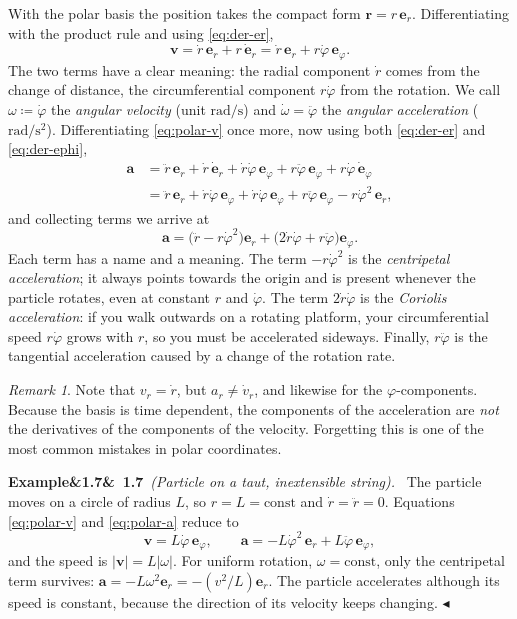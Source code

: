 \documentclass[11pt,a4paper,oneside]{report}
\numberwithin{equation}{chapter}
\newcommand{\vect}[1]{\bm{#1}}
\newcommand{\e}[1]{\vect{e}_{#1}}
\theoremstyle{plain}
\theoremstyle{definition}
\theoremstyle{remark}
\newtheorem{remark}[theorem]{Remark}
\newenvironment{example}[2]{%
  \par\addvspace{\bigskipamount}\noindent
  \textbf{Example\ifx&#1&\else~#1\fi}\ \textit{(#2).}\ \ignorespaces}%
  {\hfill$\blacktriangleleft$\par\addvspace{\bigskipamount}}
\begin{document}
With the polar basis the position takes the compact form $\vect r=r\,\e r$. Differentiating with the product rule
and using \eqref{eq:der-er},
\begin{equation}\label{eq:polar-v}
  \vect v=\dot r\,\e r+r\,\dot{\vect e}_r=\dot r\,\e r+r\dot\varphi\,\e\varphi .
\end{equation}
The two terms have a clear meaning: the radial component $\dot r$ comes from the change of distance, the
circumferential component $r\dot\varphi$ from the rotation. We call $\omega\coloneqq\dot\varphi$ the \emph{angular
velocity} (unit $\si{\radian\per\second}$) and $\dot\omega=\ddot\varphi$ the \emph{angular acceleration}
($\si{\radian\per\second\squared}$). Differentiating \eqref{eq:polar-v} once more, now using both
\eqref{eq:der-er} and \eqref{eq:der-ephi},
\begin{align*}
  \vect a&=\ddot r\,\e r+\dot r\,\dot{\vect e}_r+\dot r\dot\varphi\,\e\varphi+r\ddot\varphi\,\e\varphi+r\dot\varphi\,\dot{\vect e}_\varphi\\
  &=\ddot r\,\e r+\dot r\dot\varphi\,\e\varphi+\dot r\dot\varphi\,\e\varphi+r\ddot\varphi\,\e\varphi-r\dot\varphi^2\,\e r,
\end{align*}
and collecting terms we arrive at
\begin{equation}\label{eq:polar-a}
  \vect a=\big(\ddot r-r\dot\varphi^2\big)\e r+\big(2\dot r\dot\varphi+r\ddot\varphi\big)\e\varphi .
\end{equation}
Each term has a name and a meaning. The term $-r\dot\varphi^2$ is the \emph{centripetal acceleration}; it always
points towards the origin and is present whenever the particle rotates, even at constant $r$ and $\dot\varphi$.
The term $2\dot r\dot\varphi$ is the \emph{Coriolis acceleration}: if you walk outwards on a rotating platform, your
circumferential speed $r\dot\varphi$ grows with $r$, so you must be accelerated sideways. Finally, $r\ddot\varphi$
is the tangential acceleration caused by a change of the rotation rate.

\begin{remark}
Note that $v_r=\dot r$, but $a_r\neq\dot v_r$, and likewise for the $\varphi$-components. Because the basis is time
dependent, the components of the acceleration are \emph{not} the derivatives of the components of the velocity.
Forgetting this is one of the most common mistakes in polar coordinates.
\end{remark}

\begin{example}{1.7}{Particle on a taut, inextensible string}
The particle moves on a circle of radius $L$, so $r=L=\text{const}$ and $\dot r=\ddot r=0$. Equations
\eqref{eq:polar-v} and \eqref{eq:polar-a} reduce to
\[
  \vect v=L\dot\varphi\,\e\varphi,\qquad\vect a=-L\dot\varphi^2\,\e r+L\ddot\varphi\,\e\varphi ,
\]
and the speed is $|\vect v|=L|\omega|$. For uniform rotation, $\omega=\text{const}$, only the centripetal term
survives: $\vect a=-L\omega^2\e r=-(v^2/L)\e r$. The particle accelerates although its speed is constant, because
the direction of its velocity keeps changing.
\end{example}
\end{document}
